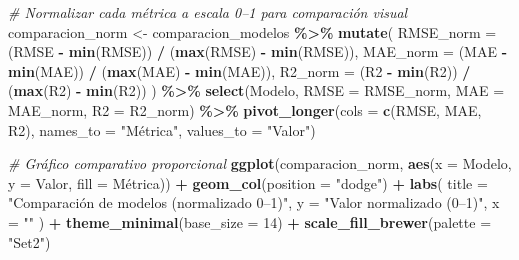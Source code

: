 \documentclass[
]{article}
\newenvironment{Shaded}{\begin{snugshade}}{\end{snugshade}}
\newcommand{\AttributeTok}[1]{\textcolor[rgb]{0.13,0.29,0.53}{#1}}
\newcommand{\CommentTok}[1]{\textcolor[rgb]{0.56,0.35,0.01}{\textit{#1}}}
\newcommand{\DecValTok}[1]{\textcolor[rgb]{0.00,0.00,0.81}{#1}}
\newcommand{\FunctionTok}[1]{\textcolor[rgb]{0.13,0.29,0.53}{\textbf{#1}}}
\newcommand{\NormalTok}[1]{#1}
\newcommand{\OtherTok}[1]{\textcolor[rgb]{0.56,0.35,0.01}{#1}}
\newcommand{\SpecialCharTok}[1]{\textcolor[rgb]{0.81,0.36,0.00}{\textbf{#1}}}
\newcommand{\StringTok}[1]{\textcolor[rgb]{0.31,0.60,0.02}{#1}}
\begin{document}
\begin{Shaded}
\begin{Highlighting}[]
\CommentTok{\# Normalizar cada métrica a escala 0–1 para comparación visual}
\NormalTok{comparacion\_norm }\OtherTok{\textless{}{-}}\NormalTok{ comparacion\_modelos }\SpecialCharTok{\%\textgreater{}\%}
  \FunctionTok{mutate}\NormalTok{(}
    \AttributeTok{RMSE\_norm =}\NormalTok{ (RMSE }\SpecialCharTok{{-}} \FunctionTok{min}\NormalTok{(RMSE)) }\SpecialCharTok{/}\NormalTok{ (}\FunctionTok{max}\NormalTok{(RMSE) }\SpecialCharTok{{-}} \FunctionTok{min}\NormalTok{(RMSE)),}
    \AttributeTok{MAE\_norm =}\NormalTok{ (MAE }\SpecialCharTok{{-}} \FunctionTok{min}\NormalTok{(MAE)) }\SpecialCharTok{/}\NormalTok{ (}\FunctionTok{max}\NormalTok{(MAE) }\SpecialCharTok{{-}} \FunctionTok{min}\NormalTok{(MAE)),}
    \AttributeTok{R2\_norm =}\NormalTok{ (R2 }\SpecialCharTok{{-}} \FunctionTok{min}\NormalTok{(R2)) }\SpecialCharTok{/}\NormalTok{ (}\FunctionTok{max}\NormalTok{(R2) }\SpecialCharTok{{-}} \FunctionTok{min}\NormalTok{(R2))}
\NormalTok{  ) }\SpecialCharTok{\%\textgreater{}\%}
  \FunctionTok{select}\NormalTok{(Modelo, }\AttributeTok{RMSE =}\NormalTok{ RMSE\_norm, }\AttributeTok{MAE =}\NormalTok{ MAE\_norm, }\AttributeTok{R2 =}\NormalTok{ R2\_norm) }\SpecialCharTok{\%\textgreater{}\%}
  \FunctionTok{pivot\_longer}\NormalTok{(}\AttributeTok{cols =} \FunctionTok{c}\NormalTok{(RMSE, MAE, R2), }\AttributeTok{names\_to =} \StringTok{"Métrica"}\NormalTok{, }\AttributeTok{values\_to =} \StringTok{"Valor"}\NormalTok{)}

\CommentTok{\# Gráfico comparativo proporcional}
\FunctionTok{ggplot}\NormalTok{(comparacion\_norm, }\FunctionTok{aes}\NormalTok{(}\AttributeTok{x =}\NormalTok{ Modelo, }\AttributeTok{y =}\NormalTok{ Valor, }\AttributeTok{fill =}\NormalTok{ Métrica)) }\SpecialCharTok{+}
  \FunctionTok{geom\_col}\NormalTok{(}\AttributeTok{position =} \StringTok{"dodge"}\NormalTok{) }\SpecialCharTok{+}
  \FunctionTok{labs}\NormalTok{(}
    \AttributeTok{title =} \StringTok{"Comparación de modelos (normalizado 0–1)"}\NormalTok{,}
    \AttributeTok{y =} \StringTok{"Valor normalizado (0–1)"}\NormalTok{,}
    \AttributeTok{x =} \StringTok{""}
\NormalTok{  ) }\SpecialCharTok{+}
  \FunctionTok{theme\_minimal}\NormalTok{(}\AttributeTok{base\_size =} \DecValTok{14}\NormalTok{) }\SpecialCharTok{+}
  \FunctionTok{scale\_fill\_brewer}\NormalTok{(}\AttributeTok{palette =} \StringTok{"Set2"}\NormalTok{)}
\end{Highlighting}
\end{Shaded}
\end{document}
